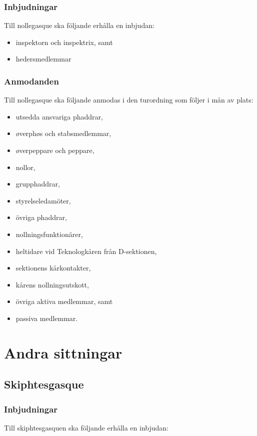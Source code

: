 \documentclass{dsekprotokoll}
\begin{document}
\subsubsection{Inbjudningar}
Till nollegasque ska följande erhålla en inbjudan:
\begin{itemize}
    \item inspektorn och inspektrix, samt
    \item hedersmedlemmar
\end{itemize}

\subsubsection{Anmodanden}
Till nollegasque ska följande anmodas i den turordning som
följer i mån av plats:
  \begin{itemize}
    \item utsedda ansvariga phaddrar,
    \item øverphøs och stabsmedlemmar,
    \item øverpeppare och peppare,
    \item nollor,
    \item grupphaddrar,
    \item styrelseledamöter,
    \item övriga phaddrar,
    \item nollningsfunktionärer,
    \item heltidare vid Teknologkåren från D-sektionen,
    \item sektionens kårkontakter,
    \item kårens nollningsutskott,
    \item övriga aktiva medlemmar, samt
    \item passiva medlemmar.
  \end{itemize}



\section{Andra sittningar}

\subsection{Skiphtesgasque}

\subsubsection{Inbjudningar}
Till skiphtesgasquen ska följande erhålla en inbjudan:
\end{document}
